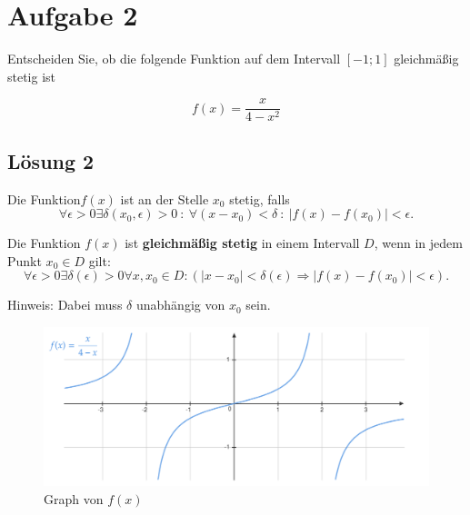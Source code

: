\documentclass[main.tex]{subfiles}
\begin{document}
\section{Aufgabe 2}
Entscheiden Sie, ob die folgende Funktion auf dem Intervall $[-1;1]$ gleichmäßig stetig ist

\begin{equation*}
    f(x) =\frac{x}{4-x^{2}}
\end{equation*}

\subsection{Lösung 2}

\textcolor[rgb]{0.4,0.72,0.06}{Die Funktion$\displaystyle f( x)$ ist an der Stelle $\displaystyle x_{0}$ stetig, falls\begin{equation*}
    \forall \epsilon  >0\exists \delta ( x_{0} ,\epsilon )  >0\ :\ \forall ( x-x_{0}) < \delta \ :\ | f( x) -f( x_{0})| < \epsilon \text{.}
\end{equation*}
}

Die Funktion $f(x)$ ist \textbf{gleichmäßig stetig} in einem Intervall $D$, wenn in jedem Punkt $x_{0} \in D$ gilt:
\begin{equation*}
    \forall \epsilon  >0\exists \delta ( \epsilon )  >0\forall x,x_{0} \in D:(| x-x_{0}| < \delta ( \epsilon ) \Longrightarrow | f( x) -f( x_{0})| < \epsilon )\text{.}
\end{equation*}

Hinweis: Dabei muss $\delta $ unabhängig von $x_{0}$ sein.\\

\begin{figure}[ht]
	\includegraphics[width=\linewidth]{fig-2.pdf}
	\caption{Graph von $f(x)$}
\end{figure}
\end{document}
